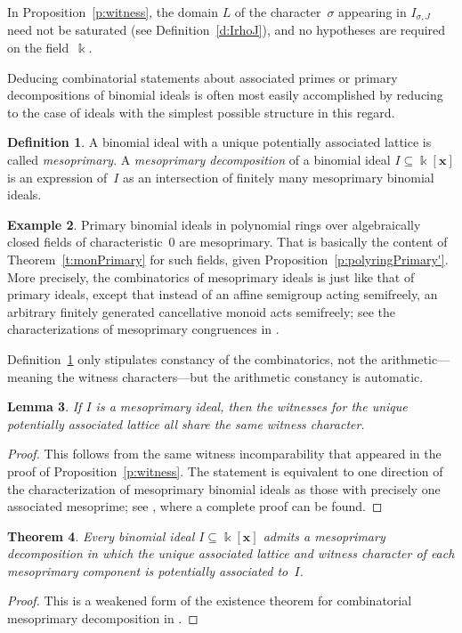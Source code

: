 \documentclass[12pt]{amsart}
\numberwithin{equation}{section}
\newtheorem{thm}{Theorem}[section]
\newtheorem{lemma}[thm]{Lemma}
\theoremstyle{definition}
\newtheorem{defn}[thm]{Definition}
\newtheorem{example}[thm]{Example}
\begin{document}
In Proposition~\ref{p:witness}, the domain $L$ of the
character~$\sigma$ appearing in $I_{\sigma,J}$ need not be saturated
(see Definition~\ref{d:IrhoJ}), and no hypotheses are required on the
field~${\Bbbk}$.

Deducing combinatorial statements about associated primes or primary
decompositions of binomial ideals is often most easily accomplished by
reducing to the case of ideals with the simplest possible structure in
this regard.

\begin{defn}\label{d:mesoprimary}
A binomial ideal with a unique potentially associated lattice is
called \emph{mesoprimary}.  A \emph{mesoprimary decomposition} of a
binomial ideal $I \subseteq {\Bbbk}[{\mathbf{x}}]$ is an expression of~$I$ as an
intersection of finitely many mesoprimary binomial ideals.
\end{defn}

\begin{example}\label{e:mesoprimary}
Primary binomial ideals in polynomial rings over algebraically closed
fields of characteristic~$0$ are mesoprimary.  That is basically the
content of Theorem~\ref{t:monPrimary} for such fields, given
Proposition~\ref{p:polyringPrimary'}.  More precisely, the
combinatorics of mesoprimary ideals is just like that of primary
ideals, except that instead of an affine semigroup acting semifreely,
an arbitrary finitely generated cancellative monoid acts semifreely;
see
the characterizations of mesoprimary congruences in
\cite{mesoprimary}.
\end{example}

Definition~\ref{d:mesoprimary} only stipulates constancy of the
combinatorics, not the arithmetic---meaning the witness
characters---but the arithmetic constancy is automatic.

\begin{lemma}
If $I$ is a mesoprimary ideal, then the witnesses for the unique
potentially associated lattice all share the same witness character.
\end{lemma}
\begin{proof}
This follows from the same witness incomparability that appeared in
the proof of Proposition~\ref{p:witness}.  The statement is equivalent
to one direction of the characterization of mesoprimary binomial
ideals as those with precisely one associated mesoprime; see
\cite{mesoprimary}, where a complete proof can be found.
\end{proof}

\begin{thm}\label{t:mesodecomp}
Every binomial ideal $I \subseteq {\Bbbk}[{\mathbf{x}}]$ admits a mesoprimary
decomposition in which the unique associated lattice and witness
character of each mesoprimary component is potentially associated
to~$I$.
\end{thm}
\begin{proof}
This is a weakened form of the existence theorem for combinatorial
mesoprimary decomposition
in \cite{mesoprimary}.
\end{proof}
\end{document}
